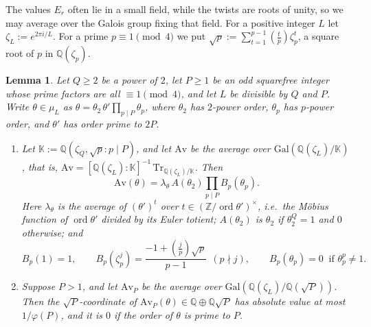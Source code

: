 \documentclass[10pt]{article}
\theoremstyle{plain}
\newtheorem{lemma}[theorem]{Lemma}
\theoremstyle{definition}
\theoremstyle{plain}
\newcommand{\Jac}[2]{\left(\tfrac{#1}{#2}\right)}
\begin{document}
The values $E_r$ often lie in a small field, while the twists are roots of unity, so we may average over the Galois group fixing that field. For a positive integer $L$ let $\zeta_L:=e^{2\pi i/L}$. For a prime $p\equiv1\pmod4$ we put $\sqrt p:=\sum_{t=1}^{p-1}\Jac tp\zeta_p^t$, a square root of $p$ in $\mathbb{Q}(\zeta_p)$.

\begin{lemma}\label{lem:average}
Let $Q\geq2$ be a power of $2$, let $P\geq1$ be an odd squarefree integer whose prime factors are all $\equiv1\pmod4$, and let $L$ be divisible by $Q$ and $P$. Write $\theta\in\mu_L$ as $\theta=\theta_2\,\theta'\prod_{p\mid P}\theta_p$, where $\theta_2$ has $2$-power order, $\theta_p$ has $p$-power order, and $\theta'$ has order prime to $2P$.
\begin{enumerate}
\item Let $\mathbb{K}:=\mathbb{Q}(\zeta_Q,\sqrt p:p\mid P)$, and let $\mathrm{Av}$ be the average over $\mathrm{Gal}(\mathbb{Q}(\zeta_L)/\mathbb{K})$, that is, $\mathrm{Av}=[\mathbb{Q}(\zeta_L):\mathbb{K}]^{-1}\,\mathrm{Tr}_{\mathbb{Q}(\zeta_L)/\mathbb{K}}$. Then
\[
\mathrm{Av}(\theta)=\lambda_\theta\,A(\theta_2)\prod_{p\mid P}B_p(\theta_p).
\]
Here $\lambda_\theta$ is the average of $(\theta')^t$ over $t\in(\mathbb{Z}/\operatorname{ord}\theta')^\times$, i.e.\ the M\"obius function of $\operatorname{ord}\theta'$ divided by its Euler totient; $A(\theta_2)$ is $\theta_2$ if $\theta_2^Q=1$ and $0$ otherwise; and
\[
B_p(1)=1,\qquad B_p(\zeta_p^j)=\frac{-1+\Jac jp\sqrt p}{p-1}\ \ (p\nmid j),\qquad B_p(\theta_p)=0\ \text{ if }\theta_p^p\neq1.
\]
\item Suppose $P>1$, and let $\mathrm{Av}_P$ be the average over $\mathrm{Gal}(\mathbb{Q}(\zeta_L)/\mathbb{Q}(\sqrt P))$. Then the $\sqrt P$-coordinate of $\mathrm{Av}_P(\theta)\in\mathbb{Q}\oplus\mathbb{Q}\sqrt P$ has absolute value at most $1/\varphi(P)$, and it is $0$ if the order of $\theta$ is prime to $P$.
\end{enumerate}
\end{lemma}
\end{document}
